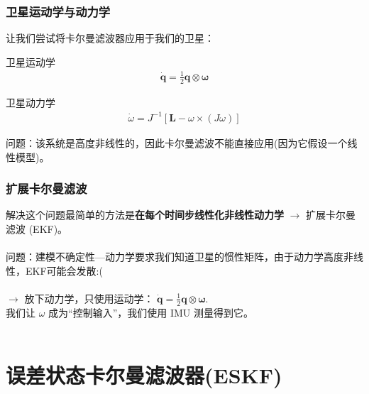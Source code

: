 \documentclass{beamer}
\begin{document}

\begin{frame}
    \frametitle{卫星运动学与动力学}
    让我们尝试将卡尔曼滤波器应用于我们的卫星：
    \begin{block}{卫星运动学}
        \begin{equation}
            \begin{aligned}
                \dot{\mathbf{q}}=\frac{1}{2} \mathbf{q} \otimes \boldsymbol{\omega}
            \end{aligned}
        \end{equation}
    \end{block}
    \begin{block}{卫星动力学}
        \begin{equation}
            \begin{aligned}
                \dot{\omega}=J^{-1}\left[\mathbf{L}-\omega \times\left(J \omega\right)\right]
            \end{aligned}
        \end{equation}
    \end{block}
    问题：该系统是高度非线性的，因此卡尔曼滤波不能直接应用(因为它假设一个线性模型)。
\end{frame}


\begin{frame}
    \frametitle{扩展卡尔曼滤波}
    解决这个问题最简单的方法是\textbf{在每个时间步线性化非线性动力学} $\rightarrow$ 扩展卡尔曼滤波 (EKF)。 \\~\\

    问题：建模不确定性---动力学要求我们知道卫星的惯性矩阵，由于动力学高度非线性，EKF可能会发散:( \\~\\

    $\rightarrow$ 放下动力学，只使用运动学： $\dot{\mathbf{q}}=\frac{1}{2} \mathbf{q} \otimes \boldsymbol{\omega}$. \\
    我们让 $\omega$ 成为“控制输入”，我们使用 IMU 测量得到它。 \\~\\
\end{frame}


\section{误差状态卡尔曼滤波器(ESKF)}
\end{document}
